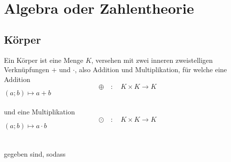 \chapter{Algebra oder Zahlentheorie}

	\section{Körper}

Ein Körper ist eine Menge $K$, versehen mit zwei inneren zweistelligen Verknüpfungen $+$ und $\cdot$, also Addition und Multiplikation, für welche eine Addition
$$\oplus\quad : \quad K \times K \rightarrow K$$
$(a;b) \longmapsto a+b $\\\\
und eine Multiplikation
$$\odot \quad : \quad K \times K \rightarrow K$$
$(a;b) \longmapsto a \cdot b $\\\\\\
gegeben sind, sodass\\

